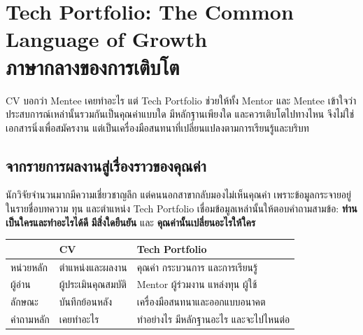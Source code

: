 \chapter{Tech Portfolio: The Common Language of Growth\\ภาษากลางของการเติบโต}

CV บอกว่า Mentee เคยทำอะไร แต่ Tech Portfolio ช่วยให้ทั้ง Mentor และ Mentee เข้าใจว่า ประสบการณ์เหล่านั้นรวมกันเป็นคุณค่าแบบใด มีหลักฐานเพียงใด และควรเติบโตไปทางไหน จึงไม่ใช่เอกสารนิ่งเพื่อสมัครงาน แต่เป็นเครื่องมือสนทนาที่เปลี่ยนแปลงตามการเรียนรู้และบริบท


\section{จากรายการผลงานสู่เรื่องราวของคุณค่า}
นักวิจัยจำนวนมากมีความเชี่ยวชาญลึก แต่คนนอกสาขากลับมองไม่เห็นคุณค่า เพราะข้อมูลกระจายอยู่ในรายชื่อบทความ ทุน และตำแหน่ง Tech Portfolio เชื่อมข้อมูลเหล่านั้นให้ตอบคำถามสามข้อ: \textbf{ท่านเป็นใครและทำอะไรได้ดี} \textbf{มีสิ่งใดยืนยัน} และ \textbf{คุณค่านั้นเปลี่ยนอะไรให้ใคร}

\begin{table}[ht]
\centering
\begin{tabularx}{\textwidth}{P{.21\textwidth}YY}
\toprule
 & \textbf{CV} & \textbf{Tech Portfolio}\\
\midrule
หน่วยหลัก & ตำแหน่งและผลงาน & คุณค่า กระบวนการ และการเรียนรู้\\
ผู้อ่าน & ผู้ประเมินคุณสมบัติ & Mentor ผู้ร่วมงาน แหล่งทุน ผู้ใช้\\
ลักษณะ & บันทึกย้อนหลัง & เครื่องมือสนทนาและออกแบบอนาคต\\
คำถามหลัก & เคยทำอะไร & ทำอย่างไร มีหลักฐานอะไร และจะไปไหนต่อ\\
\bottomrule
\end{tabularx}
\end{table}


